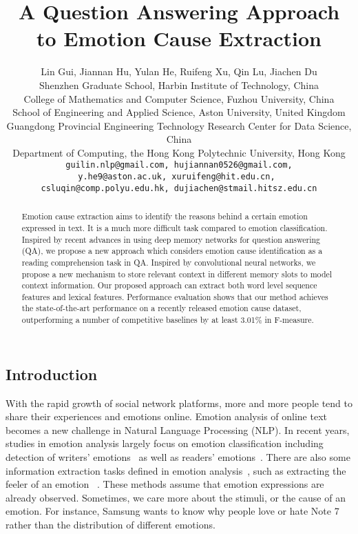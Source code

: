 \documentclass[11pt,letterpaper]{article}
\title{A Question Answering Approach to Emotion Cause Extraction}
\author{Lin Gui, Jiannan Hu, Yulan He, Ruifeng Xu\footnotemark[2], Qin Lu, Jiachen Du \\
         Shenzhen Graduate School, Harbin Institute of Technology, China
  \\    College of Mathematics and Computer Science, Fuzhou University, China   \\    School of Engineering and Applied Science, Aston University, United Kingdom    \\   Guangdong Provincial Engineering Technology Research Center for Data Science, China   \\   Department of Computing, the Hong Kong Polytechnic University, Hong Kong \\
{\tt guilin.nlp@gmail.com, hujiannan0526@gmail.com,} \\ {\tt  y.he9@aston.ac.uk, xuruifeng@hit.edu.cn, }\\{\tt csluqin@comp.polyu.edu.hk, dujiachen@stmail.hitsz.edu.cn}}
\date{}
\begin{document}
\begin{CJK*}{UTF8}{gbsn} 

\maketitle

\begin{abstract}
Emotion cause extraction aims to identify the reasons behind a certain emotion expressed in text. It is a much more difficult task compared to emotion classification. Inspired by recent advances in using deep memory networks for question answering (QA), we propose a new approach which considers emotion cause identification as a reading comprehension task in QA. Inspired by convolutional neural networks, we propose a new mechanism to store relevant context in different memory slots to model context information. Our proposed approach can extract both word level sequence features and lexical features. Performance evaluation shows that our method achieves the state-of-the-art performance on a recently released emotion cause dataset, outperforming a number of competitive baselines by at least 3.01\% in F-measure.

\end{abstract}


\section{Introduction}
\label{sec:section1}

\renewcommand{\thefootnote}{\fnsymbol{footnote}}

With the rapid
growth of social network platforms, more and more people tend to share their experiences and emotions online. Emotion analysis of online text becomes a new challenge in Natural Language Processing (NLP). In recent years, studies in emotion analysis largely focus on emotion classification including detection of writers' emotions~\cite{gao2013joint} as well as readers' emotions~\cite{chang2015linguistic}. There are also some information extraction tasks defined in emotion analysis~\cite{Chen2016A,Balahur2011EmotiNet}, such as extracting the feeler of an emotion ~\cite{das2010finding}. These methods assume that emotion expressions are already observed. Sometimes,  we care more about the stimuli, or the cause of an emotion. For instance, Samsung wants to know why people love or hate Note 7 rather than the distribution of different emotions.


\end{CJK*}
\end{document}

